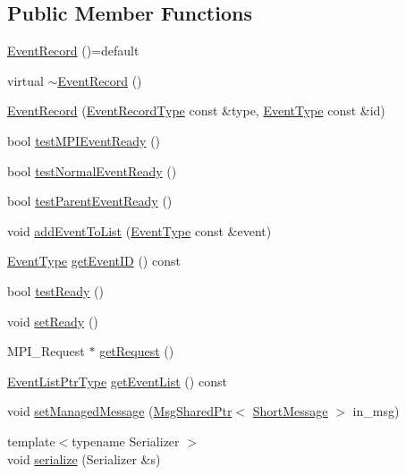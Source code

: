 \subsection*{Public Member Functions}
\begin{DoxyCompactItemize}
\item 
\hyperlink{structvt_1_1event_1_1_event_record_ad43151ff7b64e4aea444c3605b6a987e}{Event\+Record} ()=default
\item 
virtual \hyperlink{structvt_1_1event_1_1_event_record_ae46827dcbe7eab923e6083006475fa65}{$\sim$\+Event\+Record} ()
\item 
\hyperlink{structvt_1_1event_1_1_event_record_afee008ad8096ff0aa3a6bed7e94d9701}{Event\+Record} (\hyperlink{namespacevt_1_1event_a1ea9fec44d101bf40b8fd786d44ebed9}{Event\+Record\+Type} const \&type, \hyperlink{namespacevt_a009267401def7ae8bf201892222d060f}{Event\+Type} const \&id)
\item 
bool \hyperlink{structvt_1_1event_1_1_event_record_ace2823ff35b94e886a1448f8bcd039a7}{test\+M\+P\+I\+Event\+Ready} ()
\item 
bool \hyperlink{structvt_1_1event_1_1_event_record_ac19ef521b531c45e30acf3838c3b1320}{test\+Normal\+Event\+Ready} ()
\item 
bool \hyperlink{structvt_1_1event_1_1_event_record_a64981723c87d85c2d76251d333538a24}{test\+Parent\+Event\+Ready} ()
\item 
void \hyperlink{structvt_1_1event_1_1_event_record_aaeb3fbdfa74efbb88570ed88295af3ee}{add\+Event\+To\+List} (\hyperlink{namespacevt_a009267401def7ae8bf201892222d060f}{Event\+Type} const \&event)
\item 
\hyperlink{namespacevt_a009267401def7ae8bf201892222d060f}{Event\+Type} \hyperlink{structvt_1_1event_1_1_event_record_a42de3f14e7aee457dfc44f6fdc57b874}{get\+Event\+ID} () const
\item 
bool \hyperlink{structvt_1_1event_1_1_event_record_a82d8f84b3aa975cd12e1972745491106}{test\+Ready} ()
\item 
void \hyperlink{structvt_1_1event_1_1_event_record_a11d38e147a2a389c71a3fec237b7d858}{set\+Ready} ()
\item 
M\+P\+I\+\_\+\+Request $\ast$ \hyperlink{structvt_1_1event_1_1_event_record_a9444f340945fa732113583fc0b04ae7f}{get\+Request} ()
\item 
\hyperlink{namespacevt_1_1event_aa507caad8ea8ee959ccef2d57753dceb}{Event\+List\+Ptr\+Type} \hyperlink{structvt_1_1event_1_1_event_record_abb891d63f4027f5d36d53d3080c33cdf}{get\+Event\+List} () const
\item 
void \hyperlink{structvt_1_1event_1_1_event_record_a9354b50ad690549bca45eb6e68b121f0}{set\+Managed\+Message} (\hyperlink{namespacevt_ab2b3d506ec8e8d1540aede826d84a239}{Msg\+Shared\+Ptr}$<$ \hyperlink{namespacevt_a1125ac1da6c0bbf141e0ea0739d7602d}{Short\+Message} $>$ in\+\_\+msg)
\item 
{\footnotesize template$<$typename Serializer $>$ }\\void \hyperlink{structvt_1_1event_1_1_event_record_acb5e491359e5b00fad82360f49928bf8}{serialize} (Serializer \&s)
\end{DoxyCompactItemize}
